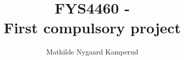 \documentclass[a4paper, english,10pt]{article}
\begin{document}
\title{FYS4460 - \\  First compulsory project}
\author{Mathilde Nygaard Kamperud}
\maketitle





\end{document}
